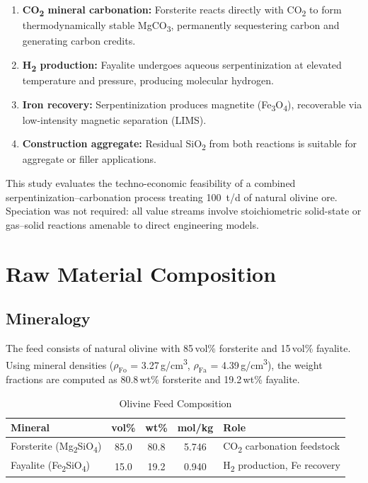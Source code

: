 \documentclass[11pt,a4paper]{article}
\begin{document}
\begin{enumerate}[noitemsep]
  \item \textbf{CO\textsubscript{2} mineral carbonation:} Forsterite reacts directly with CO\textsubscript{2} to form thermodynamically stable MgCO\textsubscript{3}, permanently sequestering carbon and generating carbon credits.
  \item \textbf{H\textsubscript{2} production:} Fayalite undergoes aqueous serpentinization at elevated temperature and pressure, producing molecular hydrogen.
  \item \textbf{Iron recovery:} Serpentinization produces magnetite (Fe\textsubscript{3}O\textsubscript{4}), recoverable via low-intensity magnetic separation (LIMS).
  \item \textbf{Construction aggregate:} Residual SiO\textsubscript{2} from both reactions is suitable for aggregate or filler applications.
\end{enumerate}

This study evaluates the techno-economic feasibility of a combined serpentinization--carbonation process treating \SI{100}{t/d} of natural olivine ore.
Speciation was not required: all value streams involve stoichiometric solid-state or gas--solid reactions amenable to direct engineering models.

\section{Raw Material Composition}

\subsection{Mineralogy}

The feed consists of natural olivine with 85\,vol\% forsterite and 15\,vol\% fayalite.
Using mineral densities ($\rho_{\text{Fo}}$ = 3.27\,g/cm\textsuperscript{3}, $\rho_{\text{Fa}}$ = 4.39\,g/cm\textsuperscript{3}), the weight fractions are computed as 80.8\,wt\% forsterite and 19.2\,wt\% fayalite.

\begin{table}[H]
\centering
\caption{Olivine Feed Composition}
\label{tab:composition}
\begin{tabular}{lcccl}
\toprule
\textbf{Mineral} & \textbf{vol\%} & \textbf{wt\%} & \textbf{mol/kg} & \textbf{Role} \\
\midrule
Forsterite (Mg\textsubscript{2}SiO\textsubscript{4}) & 85.0 & 80.8 & 5.746 & CO\textsubscript{2} carbonation feedstock \\
Fayalite (Fe\textsubscript{2}SiO\textsubscript{4})   & 15.0 & 19.2 & 0.940 & H\textsubscript{2} production, Fe recovery \\
\bottomrule
\end{tabular}
\end{table}
\end{document}
